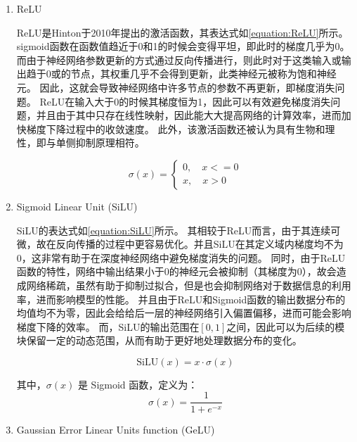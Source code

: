 \begin{enumerate}

  \item ReLU

ReLU是Hinton于2010年提出的激活函数\cite{2010ReLU}，其表达式如\cref{equation:ReLU}所示。
sigmoid函数在函数值趋近于0和1的时候会变得平坦，即此时的梯度几乎为0。而由于神经网络参数更新的方式通过反向传播进行，则此时对于这类输入或输出趋于0或的节点，其权重几乎不会得到更新，此类神经元被称为饱和神经元。
因此，这就会导致神经网络中许多节点的参数不再更新，即梯度消失问题。
ReLU在输入大于0的时候其梯度恒为1，因此可以有效避免梯度消失问题，并且由于其中只存在线性映射，因此能大大提高网络的计算效率，进而加快梯度下降过程中的收敛速度。
此外，该激活函数还被认为具有生物和理性，即与单侧抑制原理相符。

  \begin{equation}
    \label{equation:ReLU}
    \sigma(x) = 
    \left\{
    \begin{aligned}
      0, \quad x <= 0 \\
      x, \quad x > 0
    \end{aligned}
    \right.
    \end{equation}

  \item Sigmoid Linear Unit (SiLU)
  
    SiLU的表达式如\cref{equation:SiLU}所示。
    其相较于ReLU而言，由于其连续可微，故在反向传播的过程中更容易优化。并且SiLU在其定义域内梯度均不为0，这非常有助于在深度神经网络中避免梯度消失的问题。
    同时，由于ReLU函数的特性，网络中输出结果小于0的神经元会被抑制（其梯度为0），故会造成网络稀疏，虽然有助于抑制过拟合，但是也会抑制网络对于数据信息的利用率，进而影响模型的性能。
    并且由于ReLU和Sigmoid函数的输出数据分布的均值均不为零，因此会给给后一层的神经网络引入偏置偏移，进而可能会影响梯度下降的效率。
    而，SiLU的输出范围在$[0, 1]$之间，因此可以为后续的模块保留一定的动态范围，从而有助于更好地处理数据分布的变化。

    \begin{equation}
      \label{equation:SiLU}
      \text{SiLU}(x) = x \cdot \sigma(x)
    \end{equation}
  
    其中，$\sigma(x)$ 是 Sigmoid 函数，定义为：
  \begin{equation}
    \sigma(x) = \frac{1}{1 + e^{-x}}
  \end{equation}
  
  \item Gaussian Error Linear Units function (GeLU)
  

\end{enumerate}
